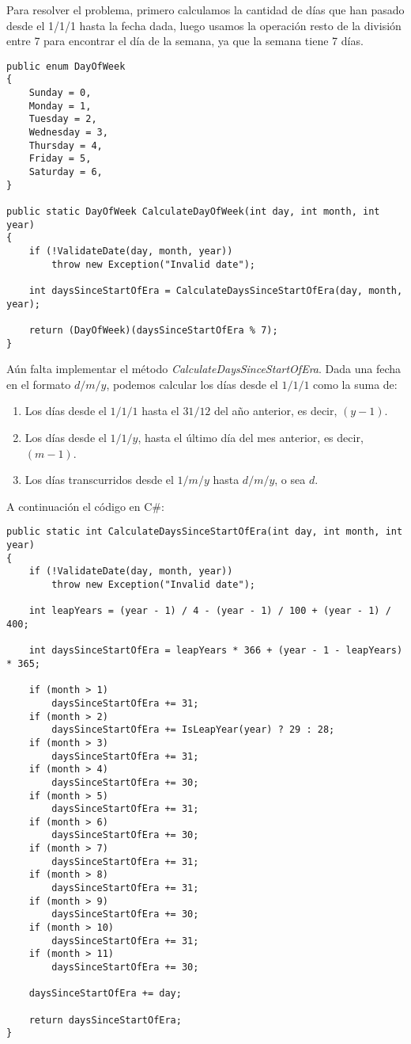 Para resolver el problema, primero calculamos la cantidad de días que han pasado desde el 1/1/1 hasta la fecha dada, luego usamos la operación resto de la división entre 7 para encontrar el día de la semana, ya que la semana tiene 7 días.

\begin{lstlisting}
public enum DayOfWeek
{
    Sunday = 0,
    Monday = 1,
    Tuesday = 2,
    Wednesday = 3,
    Thursday = 4,
    Friday = 5,
    Saturday = 6,
}

public static DayOfWeek CalculateDayOfWeek(int day, int month, int year)
{
    if (!ValidateDate(day, month, year))
        throw new Exception("Invalid date");
        
    int daysSinceStartOfEra = CalculateDaysSinceStartOfEra(day, month, year);
    
    return (DayOfWeek)(daysSinceStartOfEra % 7);
}
\end{lstlisting}

Aún falta implementar el método \textit{CalculateDaysSinceStartOfEra}. Dada una fecha en el formato $d/m/y$, podemos calcular los días desde el $1/1/1$ como la suma de:
\begin{enumerate}
    \item Los días desde el $1/1/1$ hasta el $31/12$ del año anterior, es decir, $(y-1)$.
    \item Los días desde el $1/1/y$, hasta el último día del mes anterior, es decir, $(m-1)$.
    \item Los días transcurridos desde el $1/m/y$  hasta $d/m/y$, o sea $d$.
\end{enumerate}

A continuación el código en C\#:

\begin{lstlisting}
public static int CalculateDaysSinceStartOfEra(int day, int month, int year)
{
    if (!ValidateDate(day, month, year))
        throw new Exception("Invalid date");
        
    int leapYears = (year - 1) / 4 - (year - 1) / 100 + (year - 1) / 400;
    
    int daysSinceStartOfEra = leapYears * 366 + (year - 1 - leapYears) * 365;
    
    if (month > 1)
        daysSinceStartOfEra += 31;
    if (month > 2)
        daysSinceStartOfEra += IsLeapYear(year) ? 29 : 28;
    if (month > 3)
        daysSinceStartOfEra += 31;
    if (month > 4)
        daysSinceStartOfEra += 30;
    if (month > 5)
        daysSinceStartOfEra += 31;
    if (month > 6)
        daysSinceStartOfEra += 30;
    if (month > 7)
        daysSinceStartOfEra += 31;
    if (month > 8)
        daysSinceStartOfEra += 31;
    if (month > 9)
        daysSinceStartOfEra += 30;
    if (month > 10)
        daysSinceStartOfEra += 31;
    if (month > 11)
        daysSinceStartOfEra += 30;
        
    daysSinceStartOfEra += day;
    
    return daysSinceStartOfEra;
}
\end{lstlisting}

